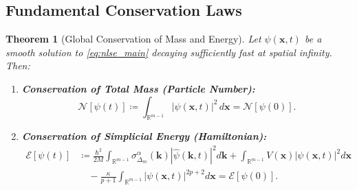 \documentclass[11pt,a4paper]{article}
\theoremstyle{plain}
\newtheorem{theorem}{Theorem}[section]
\theoremstyle{definition}
\theoremstyle{remark}
\numberwithin{equation}{section}
\begin{document}
\subsection{Fundamental Conservation Laws}

\begin{theorem}[Global Conservation of Mass and Energy]
Let $\psi(\mathbf{x}, t)$ be a smooth solution to \eqref{eq:nlse_main} decaying sufficiently fast at spatial infinity. Then:
\begin{enumerate}
    \item \textbf{Conservation of Total Mass (Particle Number):}
    \begin{equation}
    \mathcal{N}[\psi(t)] \coloneqq \int_{\mathbb{R}^{m-1}} |\psi(\mathbf{x}, t)|^2 \, d\mathbf{x} = \mathcal{N}[\psi(0)].
    \end{equation}
    \item \textbf{Conservation of Simplicial Energy (Hamiltonian):}
    \begin{align}
    \mathcal{E}[\psi(t)] &\coloneqq \frac{\hbar^2}{2M}\int_{\mathbb{R}^{m-1}} \sigma_{\Delta_m}^\alpha(\mathbf{k}) |\widehat{\psi}(\mathbf{k}, t)|^2 d\mathbf{k} + \int_{\mathbb{R}^{m-1}} V(\mathbf{x})|\psi(\mathbf{x}, t)|^2 d\mathbf{x} \nonumber\\
    &\quad - \frac{\kappa}{p+1}\int_{\mathbb{R}^{m-1}} |\psi(\mathbf{x}, t)|^{2p+2} d\mathbf{x} = \mathcal{E}[\psi(0)].
    \end{align}
\end{enumerate}
\end{theorem}
\end{document}
